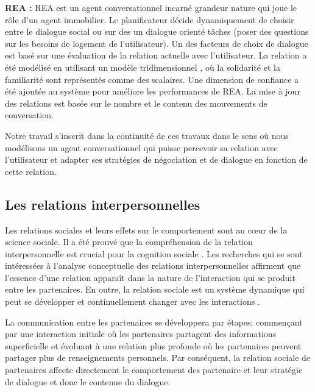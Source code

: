 \documentclass[a4paper,french]{article}
\begin{document}
\par \textbf{REA : } REA \cite{bickmore2005establishing} est un agent conversationnel incarné grandeur nature qui joue le rôle d'un agent immobilier. Le planificateur décide dynamiquement  de choisir entre le dialogue social  ou sur des un dialogue orienté tâches (poser des questions sur les besoins de logement de l'utilisateur). Un des facteurs de choix de dialogue est basé sur une évaluation de la relation actuelle avec l'utilisateur. La relation a été modélisé en utilisant un modèle tridimensionnel \cite{svennevig2000getting}, où la solidarité et la familiarité sont représentés comme des scalaires. Une dimension de confiance a été ajoutée au système pour améliore les performances de REA. La  mise à jour des  relations est basée sur le nombre et le contenu des mouvements de conversation.

\par Notre travail s'inscrit dans la continuité de ces travaux dans le sens où nous modélisons un agent conversationnel qui puisse percevoir sa relation avec l'utilisateur et adapter ses stratégies de négociation et de dialogue en fonction de cette relation. 

\subsection{Les relations interpersonnelles}
\par Les relations sociales et leurs effets sur le comportement sont au cœur de la science sociale. Il a été prouvé que la compréhension de la relation interpersonnelle est crucial pour la cognition sociale \cite{reis2000relationship}. Les recherches qui se sont intéressées à l'analyse conceptuelle des relations interpersonnelles affirment que l'essence d'une relation apparaît dans la nature de l'interaction qui se produit entre les partenaires. En outre, la relation sociale est un système dynamique qui peut se développer et continuellement changer avec les interactions \cite {reis2000relationship,svennevig2000getting}.
\par La communication entre les partenaires se développera par étapes; commençant par une interaction initiale où les partenaires partagent des informations superficielle et évoluant à une relation plus profonde où les partenaires peuvent partager plus de renseignements personnels. Par conséquent, la relation sociale de partenaires affecte directement le comportement des partenaire et leur stratégie de dialogue et donc le contenue du dialogue.
\end{document}
